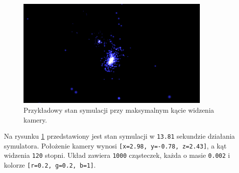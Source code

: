 \documentclass[12pt, twoside, openany]{report}
\begin{document}

\begin{figure}[H]
\centering
\includegraphics[width=0.85\textwidth,height=\textheight,keepaspectratio]{1_041.png}
\caption{Przykładowy stan symulacji przy maksymalnym kącie widzenia kamery.}
\label{fig:stan5}
\end{figure}

Na rysunku \ref{fig:stan5} przedstawiony jest stan symulacji w \texttt{13.81} sekundzie działania symulatora. Położenie kamery wynosi \texttt{[x=2.98, y=-0.78, z=2.43]}, a kąt widzenia \texttt{120} stopni. Układ zawiera \texttt{1000} cząsteczek, każda o masie \texttt{0.002} i kolorze \texttt{[r=0.2, g=0.2, b=1]}.
\end{document}
